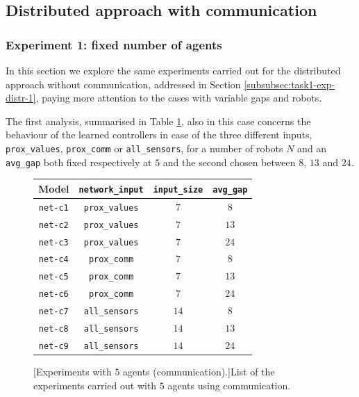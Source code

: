 \bigskip
\subsection{Distributed approach with communication}
\label{subsec:task1-exp-distr-comm}


\subsubsection{Experiment 1: fixed number of agents}
\label{subsubsec:task1-exp-comm-1}

In this section we explore the same experiments carried out for the distributed 
approach without communication, addressed in Section 
\ref{subsubsec:task1-exp-distr-1}, paying more attention to the cases with 
variable gaps and robots. 

The first analysis, summarised in Table \ref{tab:modeln5comm}, also in this case  
concerns the behaviour of the learned controllers in case of the three different 
inputs, \texttt{prox\_values}, \texttt{prox\_comm} or 
\texttt{all\_sensors}, for a number of robots $N$ and an \texttt{avg\_gap} both 
fixed respectively at $5$ and the second chosen between $8$, $13$ and $24$.
\begin{figure}[!htb]
	\centering
	\begin{tabular}{cccc}
		\toprule
		\textbf{Model} \quad & \textbf{\texttt{network\_input}} & 
		\textbf{\texttt{input\_size}} &
		\textbf{\texttt{avg\_gap}} \\
		\midrule
		\texttt{net-c1} 				 & \texttt{prox\_values}	&  $  7$  &  $  8$  \\
		\texttt{net-c2} 			 	 & \texttt{prox\_values}	&  $  7$  &  $13$ \\
		\texttt{net-c3} 				 & \texttt{prox\_values}	&  $  7$  &  $24$  \\
		\texttt{net-c4} 				 & \texttt{prox\_comm}	  &  $  7$  &  $  8$  \\
		\texttt{net-c5} 				 & \texttt{prox\_comm}	  &  $  7$  &  $13$  \\
		\texttt{net-c6} 				 & \texttt{prox\_comm}	  &  $  7$  &  $24$  \\
		\texttt{net-c7} 				 & \texttt{all\_sensors}	  &  $14$  &  $  8$  \\
		\texttt{net-c8} 				 & \texttt{all\_sensors}	  &  $14$  &  $13$ 	\\
		\texttt{net-c9} 				 & \texttt{all\_sensors}	  &  $14$  &  $24$ 	\\
		\bottomrule
	\end{tabular}
	[Experiments with $5$ agents (communication).]{List of the 
	experiments carried out with $5$ agents using communication.}
	\label{tab:modeln5comm}
\end{figure}

